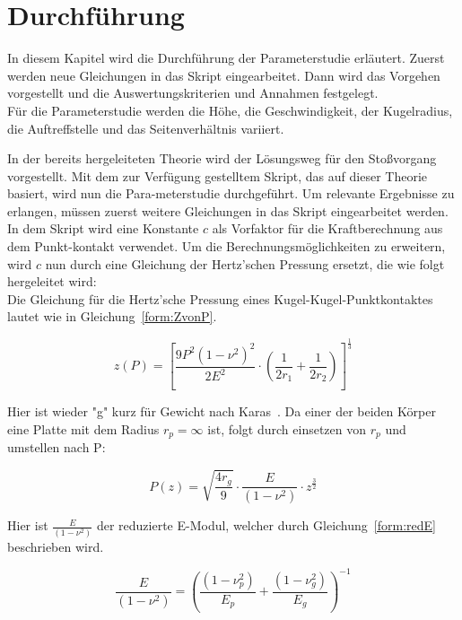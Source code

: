\chapter{Durchführung}
\label{chap:Durchfuehrung}

In diesem Kapitel wird die Durchführung der Parameterstudie erläutert. Zuerst werden neue Gleichungen in das Skript eingearbeitet. Dann wird das Vorgehen vorgestellt und die Auswertungskriterien und Annahmen festgelegt.\\
Für die Parameterstudie werden die Höhe, die Geschwindigkeit, der Kugelradius, die Auftreffstelle und das Seitenverhältnis variiert.

In der bereits hergeleiteten Theorie wird der Lösungsweg für den Stoßvorgang vorgestellt. Mit dem zur Verfügung gestelltem Skript, das auf dieser Theorie basiert, wird nun die Para-meterstudie durchgeführt. Um relevante Ergebnisse zu erlangen, müssen zuerst weitere Gleichungen in das Skript eingearbeitet werden.\\
In dem Skript wird eine Konstante $c$ als Vorfaktor für die Kraftberechnung aus dem Punkt-kontakt verwendet. Um die Berechnungsmöglichkeiten zu erweitern, wird $c$ nun durch eine Gleichung der Hertz'schen Pressung ersetzt, die wie folgt hergeleitet wird:\\
Die Gleichung für die Hertz'sche Pressung eines Kugel-Kugel-Punktkontaktes lautet wie in Gleichung~\ref{form:ZvonP}.

\begin{equation}
	\label{form:ZvonP}
	z(P) = \left[ \frac{9 P^{2} (1 - \nu^{2})^{2}}{2 E^{2}} \cdot \left( \frac{1}{2 r_{1}} + \frac{1}{2 r_{2}} \right) \right]^{\frac{1}{3}}
\end{equation}

Hier ist wieder "g" kurz für Gewicht nach Karas~\cite{Karas.1939}. Da einer der beiden Körper eine Platte mit dem Radius $r_{p} = \infty$ ist, folgt durch einsetzen von $r_{p}$ und umstellen nach P:

\begin{equation}
	\label{form:PvonZ}
	P(z) = \sqrt{\frac{4 r_{g}}{9}} \cdot \frac{E}{(1 - \nu^{2})} \cdot z^{\frac{3}{2}}
\end{equation}
	
Hier ist $\frac{E}{(1 - \nu^{2})}$ der reduzierte E-Modul, welcher durch Gleichung~\ref{form:redE} beschrieben wird.

\begin{equation}
	\label{form:redE}
	\frac{E}{(1 - \nu^{2})} = \left( \frac{(1 - \nu_{p}^{2})}{E_{p}} + \frac{(1 - \nu_{g}^{2})}{E_{g}} \right)^{-1}
\end{equation} 

